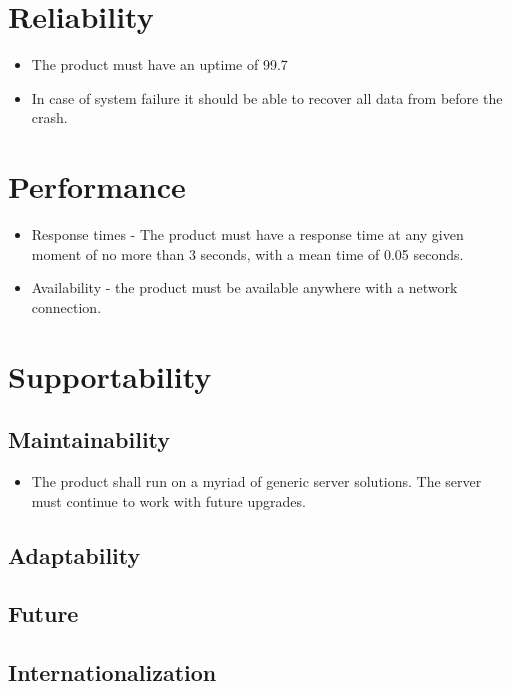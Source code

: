 \documentclass[10pt]{article}
\begin{document}
\section{Reliability}
\begin{itemize}
\item The product must have an uptime of 99.7%
\item In case of system failure it should be able to recover all data from before the crash.
\end{itemize}

\section{Performance}
\begin{itemize}
\item Response times - The product must have a response time at any given moment of no more than 3 seconds, with a mean time of 0.05 seconds.
\item Availability - the product must be available anywhere with a network connection.
\end{itemize}

\section{Supportability}

\subsection{Maintainability}

\begin{itemize}

\item The product shall run on a myriad of generic server solutions. The server must continue to work with future upgrades.
\end{itemize}
\subsection{Adaptability}
\subsection{Future} 

\subsection{Internationalization}
\end{document}
